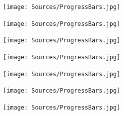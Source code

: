 \begin{figure}[H]
    \begin{subfigure}[l]{23pt}
        \texttt{[image: Sources/ProgressBars.jpg]}
    \end{subfigure}
    \begin{subfigure}[l]{23pt}
        \texttt{[image: Sources/ProgressBars.jpg]}
    \end{subfigure}
    \begin{subfigure}[l]{23pt}
        \texttt{[image: Sources/ProgressBars.jpg]}
    \end{subfigure}
    \begin{subfigure}[l]{23pt}
        \texttt{[image: Sources/ProgressBars.jpg]}
    \end{subfigure}
    \begin{subfigure}[l]{23pt}
        \texttt{[image: Sources/ProgressBars.jpg]}
    \end{subfigure}
    \begin{subfigure}[l]{23pt}
        \texttt{[image: Sources/ProgressBars.jpg]}
    \end{subfigure}
    \begin{subfigure}[l]{23pt}
        \texttt{[image: Sources/ProgressBars.jpg]}
    \end{subfigure}
\end{figure}

\vfill

